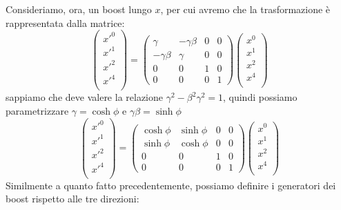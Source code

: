 Consideriamo, ora, un boost lungo $x$, per cui avremo che la trasformazione è rappresentata dalla matrice:
\begin{equation}
\begin{pmatrix}
    x'^0 \\
    x'^1 \\
    x'^2 \\
    x'^4 \\
\end{pmatrix}=
\begin{pmatrix}
\gamma & -\gamma\beta & 0 & 0   \\
 -\gamma\beta &\gamma & 0 & 0    \\
  0 & 0 & 1 & 0                   \\
  0 & 0 & 0 & 1
\end{pmatrix}\begin{pmatrix}
    x^0 \\
    x^1 \\
    x^2 \\
    x^4 \\
\end{pmatrix}
\end{equation}
sappiamo che deve valere la relazione $\gamma^2-\beta^2\gamma^2=1$, quindi possiamo parametrizzare $\gamma=\cosh{\phi}$ e $\gamma \beta=\sinh{\phi}$
\begin{equation}
\begin{pmatrix}
    x'^0 \\
    x'^1 \\
    x'^2 \\
    x'^4 \\
\end{pmatrix}=
\begin{pmatrix}
\cosh{\phi} & \sinh{\phi} & 0 & 0   \\
 \sinh{\phi} &\cosh{\phi} & 0 & 0    \\
  0 & 0 & 1 & 0                   \\
  0 & 0 & 0 & 1
\end{pmatrix}\begin{pmatrix}
    x^0 \\
    x^1 \\
    x^2 \\
    x^4 \\
\end{pmatrix}
\end{equation}
Similmente a quanto fatto precedentemente, possiamo definire i generatori dei boost rispetto alle tre direzioni:
